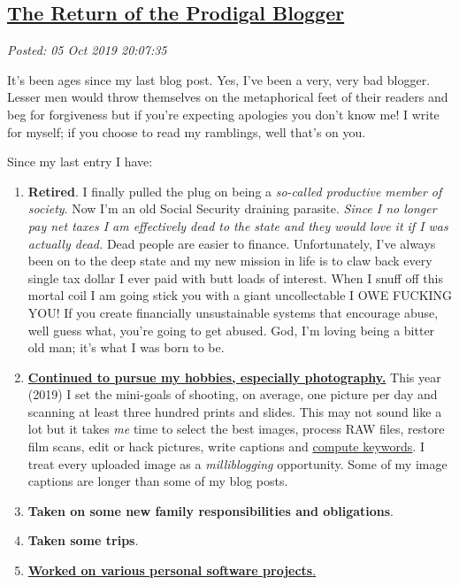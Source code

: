 %

\subsection*{\href{http://analyzethedatanotthedrivel.org/2019/10/05/the-return-of-the-prodigal-blogger/}{The Return of the Prodigal Blogger}}


\noindent\emph{Posted: 05 Oct 2019 20:07:35}
\vspace{6pt}

It's been ages since my last blog post. Yes, I've been a very, very bad
blogger. Lesser men would throw themselves on the metaphorical feet of
their readers and beg for forgiveness but if you're expecting apologies
you don't know me! I write for myself; if you choose to read my
ramblings, well that's on you.

Since my last entry I have:

\begin{enumerate}
\item
  \textbf{Retired}. I finally pulled the plug on being a \emph{so-called
  productive member of society}. Now I'm an old Social Security
  draining parasite. \emph{Since I no longer pay net taxes I am
  effectively dead to the state and they would love it if I was actually
  dead.} Dead people are easier to finance. Unfortunately, I've always
  been on to the deep state and my new mission in life is to claw back
  every single tax dollar I ever paid with butt loads of interest. When
  I snuff off this mortal coil I am going stick you with a giant
  uncollectable I OWE FUCKING YOU! If you create financially
  unsustainable systems that encourage abuse, well guess what, you're
  going to get abused. God, I'm loving being a bitter old man; it's what
  I was born to be.
\item
  \href{https://conceptcontrol.smugmug.com/}{\textbf{\textbf{Continued
  to pursue my hobbies, especially photography.}}} This year (2019) I set
  the mini-goals of shooting, on average, one picture per day and
  scanning at least three hundred prints and slides. This may not sound
  like a lot but it takes \emph{me} time to select the best images,
  process RAW files, restore film scans, edit or hack pictures, write
  captions and
  \href{https://nbviewer.jupyter.org/github/bakerjd99/smugpyter/blob/master/notebooks/Setting\%20SmugMug\%20Print\%20Size\%20and\%20Geotag\%20Keywords\%20with\%20Jupyter\%20and\%20Python.ipynb}{compute
  keywords}. I treat every uploaded image as a
  \emph{milli}\emph{blogging} opportunity. Some of my image captions
  are longer than some of my blog posts. 
\item
  \textbf{Taken on some new family responsibilities and obligations}.
\item
  \textbf{Taken some trips}.
\item
  \href{https://github.com/bakerjd99/smugpyter}{\textbf{Worked on
  various personal software projects}.}
\end{enumerate}

